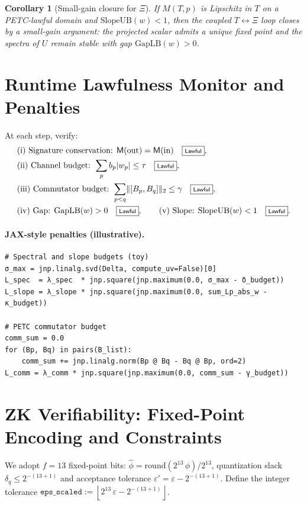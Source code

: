 \documentclass[11pt]{article}
\DeclarePairedDelimiter{\norm}{\lVert}{\rVert}
\newcommand{\GapLB}{\mathrm{GapLB}}
\newcommand{\SlopeUB}{\mathrm{SlopeUB}}
\newcommand{\fixbits}{13}
\newcommand{\qscale}{2^{\fixbits}}
\newcommand{\dq}{2^{-(\fixbits+1)}}     %
\newcommand{\epsprime}{\varepsilon - \dq}
\newcommand{\epsscaled}{\left\lfloor \qscale\,\epsprime \right\rfloor}
\newcommand{\LawfulOK}{\fbox{\scriptsize\sf Lawful}}
\theoremstyle{plain}
\newtheorem{corollary}{Corollary}
\theoremstyle{definition}
\theoremstyle{remark}
\begin{document}
\begin{corollary}[Small-gain closure for $\Xi$]
\label{cor:small-gain}
If $M(T,p)$ is Lipschitz in $T$ on a PETC-lawful domain and $\SlopeUB(w)<1$, then the coupled $T\leftrightarrow\Xi$ loop closes by a small-gain argument: the projected scalar admits a unique fixed point and the spectra of $U$ remain stable with gap $\GapLB(w)>0$.
\end{corollary}

\section{Runtime Lawfulness Monitor and Penalties}
\label{sec:lawfulness}
At each step, verify:
\begin{align*}
&\text{(i) Signature conservation: } \mathsf{M}(\mathrm{out})=\mathsf{M}(\mathrm{in}) \quad \LawfulOK,\\
&\text{(ii) Channel budget: } \sum_p b_p|w_p|\le \tau \quad \LawfulOK,\\
&\text{(iii) Commutator budget: } \sum_{p<q}\norm{[B_p,B_q]}_2\le \gamma \quad \LawfulOK,\\
&\text{(iv) Gap: } \GapLB(w)>0 \quad \LawfulOK,\qquad
\text{(v) Slope: } \SlopeUB(w)<1 \quad \LawfulOK.
\end{align*}

\paragraph{JAX-style penalties (illustrative).}
\begin{minipage}{\linewidth}
\begin{verbatim}
# Spectral and slope budgets (toy)
σ_max = jnp.linalg.svd(Delta, compute_uv=False)[0]
L_spec  = λ_spec  * jnp.square(jnp.maximum(0.0, σ_max - δ_budget))
L_slope = λ_slope * jnp.square(jnp.maximum(0.0, sum_Lp_abs_w - κ_budget))

# PETC commutator budget
comm_sum = 0.0
for (Bp, Bq) in pairs(B_list):
    comm_sum += jnp.linalg.norm(Bp @ Bq - Bq @ Bp, ord=2)
L_comm = λ_comm * jnp.square(jnp.maximum(0.0, comm_sum - γ_budget))
\end{verbatim}
\end{minipage}

\section{ZK Verifiability: Fixed-Point Encoding and Constraints}
\label{sec:zk}
We adopt $f=\fixbits$ fixed-point bits: $\hat\phi=\mathrm{round}(\qscale\,\phi)/\qscale$, quantization slack $\delta_q\le \dq$ and acceptance tolerance $\varepsilon'=\epsprime$. Define the integer tolerance $\texttt{eps\_scaled}:=\epsscaled$.
\end{document}
